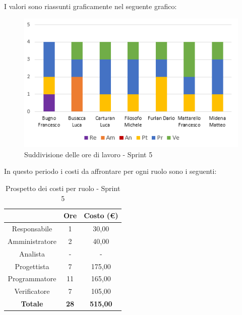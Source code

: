I valori sono riassunti graficamente nel seguente grafico:

\begin{figure}[H]
  \centering
  \includegraphics[scale=1.0]{immagini/6Sprint_oreLavoro.png}
  \caption{Suddivisione delle ore di lavoro - Sprint 5}
\end{figure}

\pagebreak
In questo periodo i costi da affrontare per ogni ruolo sono i seguenti:

\begin{table}[H]
  \centering
  \renewcommand{\arraystretch}{1.8}
  \begin{tabular}{c|c|c}
    \rowcolor[HTML]{125E28}
    \multicolumn{1}{c}{\color[HTML]{FFFFFF}\textbf{Ruolo}}
                    & \multicolumn{1}{c}{\color[HTML]{FFFFFF}\textbf{Ore}}
                    & \multicolumn{1}{c}{\color[HTML]{FFFFFF}\textbf{Costo (€)}}                   \\
    \hline
    Responsabile    & 1                                                          & 30,00           \\
    Amministratore  & 2                                                          & 40,00           \\
    Analista        & -                                                          & -               \\
    Progettista     & 7                                                          & 175,00          \\
    Programmatore   & 11                                                         & 165,00          \\
    Verificatore    & 7                                                          & 105,00          \\
    \textbf{Totale} & \textbf{28}                                                & \textbf{515,00}
  \end{tabular}
  \caption{Prospetto dei costi per ruolo - Sprint 5}
\end{table}


